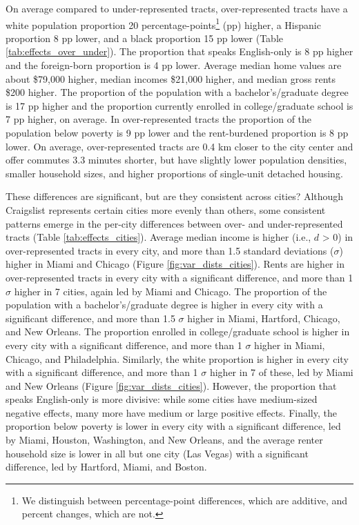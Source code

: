 \documentclass[11pt,onecolumn]{article} %
\begin{document}
On average compared to under-represented tracts, over-represented tracts have a white population proportion 20 percentage-points\footnote{We distinguish between percentage-point differences, which are additive, and percent changes, which are not.} (pp) higher, a Hispanic proportion 8 pp lower, and a black proportion 15 pp lower (Table \ref{tab:effects_over_under}). The proportion that speaks English-only is 8 pp higher and the foreign-born proportion is 4 pp lower. Average median home values are about \$79,000 higher, median incomes \$21,000 higher, and median gross rents \$200 higher. The proportion of the population with a bachelor's/graduate degree is 17 pp higher and the proportion currently enrolled in college/graduate school is 7 pp higher, on average. In over-represented tracts the proportion of the population below poverty is 9 pp lower and the rent-burdened proportion is 8 pp lower. On average, over-represented tracts are 0.4 km closer to the city center and offer commutes 3.3 minutes shorter, but have slightly lower population densities, smaller household sizes, and higher proportions of single-unit detached housing.

These differences are significant, but are they consistent across cities? Although Craigslist represents certain cities more evenly than others, some consistent patterns emerge in the per-city differences between over- and under-represented tracts (Table \ref{tab:effects_cities}). Average median income is higher (i.e., $d$ > 0) in over-represented tracts in every city, and more than 1.5 standard deviations ($\sigma$) higher in Miami and Chicago (Figure \ref{fig:var_dists_cities}). Rents are higher in over-represented tracts in every city with a significant difference, and more than 1 $\sigma$ higher in 7 cities, again led by Miami and Chicago. The proportion of the population with a bachelor's/graduate degree is higher in every city with a significant difference, and more than 1.5 $\sigma$ higher in Miami, Hartford, Chicago, and New Orleans. The proportion enrolled in college/graduate school is higher in every city with a significant difference, and more than 1 $\sigma$ higher in Miami, Chicago, and Philadelphia. Similarly, the white proportion is higher in every city with a significant difference, and more than 1 $\sigma$ higher in 7 of these, led by Miami and New Orleans (Figure \ref{fig:var_dists_cities}). However, the proportion that speaks English-only is more divisive: while some cities have medium-sized negative effects, many more have medium or large positive effects. Finally, the proportion below poverty is lower in every city with a significant difference, led by Miami, Houston, Washington, and New Orleans, and the average renter household size is lower in all but one city (Las Vegas) with a significant difference, led by Hartford, Miami, and Boston.
\end{document}
